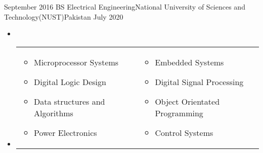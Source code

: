 {\begin{educations}
  \experience
    {September 2016} {BS Electrical Engineering}{National University of Sciences and Technology(NUST)}{Pakistan} 
    {July 2020}    {
    \begin{itemize}
        \item[]
        \item[]
        \begin{tabular}{m{8cm} m{8cm}}
            \begin{itemize}
                \item Microprocessor Systems
                \item Digital Logic Design 
                \item Data structures and Algorithms
                \item Power Electronics 
            \end{itemize} 
            &
            \begin{itemize}
                \item Embedded Systems 
                \item Digital Signal Processing
                \item Object Orientated Programming
                \item Control Systems 
            \end{itemize} 
        \end{tabular}
    \end{itemize}
                    }
                    {}
  \emptySeparator
\end{educations}
}
